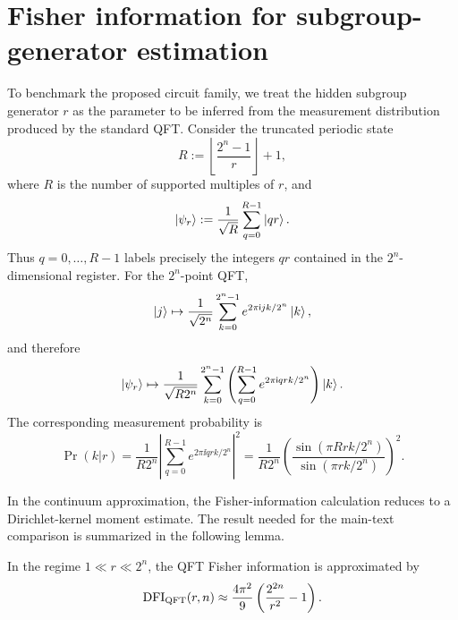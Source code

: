 \section{Fisher information for subgroup-generator estimation}
\label{app:qft_fisher_information}
To benchmark the proposed circuit family, we treat the hidden subgroup generator $r$ as the parameter to be inferred from the measurement distribution produced by the standard QFT. Consider the truncated periodic state
\begin{equation}
    R:=\left\lfloor\frac{2^n-1}{r}\right\rfloor+1,
\end{equation}
where $R$ is the number of supported multiples of $r$, and
\begin{equation}
    \ket{\psi_r}
    :=
    \frac{1}{\sqrt{R}}
    \sum_{q=0}^{R-1}\ket{qr}.
\end{equation}
Thus $q=0,\ldots,R-1$ labels precisely the integers $qr$ contained in the
$2^n$-dimensional register.
For the $2^n$-point QFT,
\begin{equation}
    \ket{j}
    \mapsto
    \frac{1}{\sqrt{2^n}}
    \sum_{k=0}^{2^n-1}
    e^{2\pi \mathsf{i} jk/2^n}\ket{k},
\end{equation}
and therefore
\begin{equation}
    \ket{\psi_r}
    \mapsto
    \frac{1}{\sqrt{R2^n}}
    \sum_{k=0}^{2^n-1}
    \left(
        \sum_{q=0}^{R-1}
        e^{2\pi \mathsf{i} q r k/2^n}
    \right)\ket{k}.
\end{equation}
The corresponding measurement probability is
\begin{equation}
    \Pr(k|r)
    =
    \frac{1}{R2^n}
    \left|
        \sum_{q=0}^{R-1}
        e^{2\pi \ii q r k/2^n}
    \right|^2
    =
    \frac{1}{R2^n}
    \left(
        \frac{\sin(\pi R r k/2^n)}{\sin(\pi r k/2^n)}
    \right)^2.
\end{equation}

In the continuum approximation, the Fisher-information calculation reduces to a Dirichlet-kernel moment estimate. The result needed for the main-text comparison is summarized in the following lemma.

\begin{lemma}
\label{thm:qft_fisher_information}
    In the regime $1\ll r\ll 2^n$, the QFT Fisher information is approximated by 
    \begin{equation}
        \mathrm{DFI}_{\mathrm{QFT}}(r,n)
        \approx
        \frac{4\pi^2}{9}\left(\frac{2^{2n}}{r^2}-1\right).
    \end{equation}
\end{lemma}

